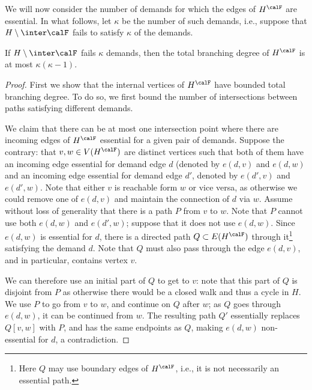 We will now consider the number of demands for which the edges of $H^\calF$ are essential. In what follows, let $\kappa$ be the number of such demands, i.e., suppose that $H\setminus \inter \calF$ fails to satisfy $\kappa$ of the demands.

\begin{lemma}\label{lem:essentials_intersectioncount}
If $H\setminus \inter \calF$ fails $\kappa$ demands, then the total branching degree of $H^\calF$ is at most $\kappa(\kappa-1)$.
\end{lemma}

\begin{proof}
First we show that the internal vertices of $H^\calF$ have bounded total branching degree. To do so, we first bound the number of intersections between paths satisfying different demands.

We claim that there can be at most one intersection point where there are incoming edges of $H^\calF$ essential for a given pair of demands. Suppose the contrary: that $v,w\in V(H^\calF)$ are distinct vertices such that both of them have an incoming edge essential for demand edge $d$ (denoted by $e(d,v)$ and $e(d,w)$ and an incoming edge essential for demand edge $d'$, denoted by $e(d',v)$ and $e(d',w)$. Note that either $v$ is reachable form $w$ or vice versa, as otherwise we could remove one of $e(d,v)$ and maintain the connection of $d$ via $w$. Assume without loss of generality that there is a path $P$ from $v$ to $w$. Note that $P$ cannot use both $e(d,w)$ and $e(d',w)$; suppose that it does not use $e(d,w)$.  Since $e(d,w)$ is essential for $d$, there is a directed path $Q\subset E(H^\calF)$ through it\footnote{Here $Q$ may use boundary edges of $H^\calF$, i.e., it is not necessarily an essential path.} satisfying the demand $d$. Note that $Q$ must also pass through the edge $e(d,v)$, and in particular, contains vertex $v$.

We can therefore use an initial part of $Q$ to get to $v$: note that this part of $Q$ is disjoint from $P$ as otherwise there would be a closed walk and thus a cycle in $H$. We use $P$ to go from $v$ to $w$, and continue on $Q$ after $w$; as $Q$ goes through $e(d,w)$, it can be continued from $w$. The resulting path $Q'$ essentially replaces $Q[v,w]$ with $P$, and has the same endpoints as $Q$, making $e(d,w)$ non-essential for $d$, a contradiction.


\end{proof}
